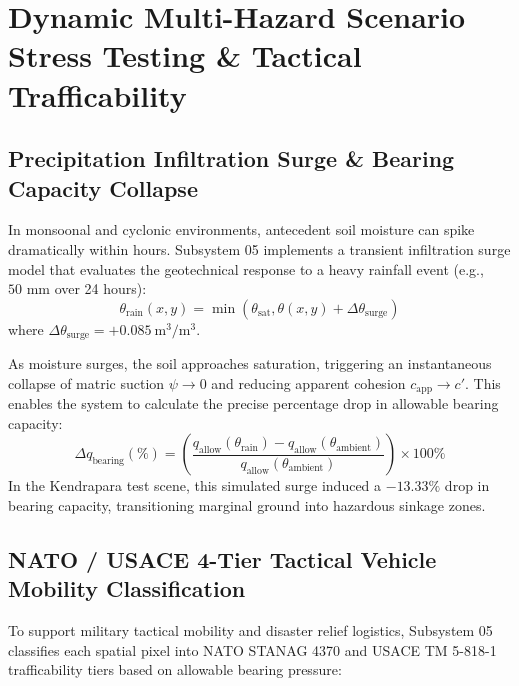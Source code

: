 \documentclass[11pt,a4paper]{article}
\theoremstyle{definition}
\theoremstyle{remark}
\begin{document}
\section{Dynamic Multi-Hazard Scenario Stress Testing \& Tactical Trafficability}

\subsection{Precipitation Infiltration Surge \& Bearing Capacity Collapse}
In monsoonal and cyclonic environments, antecedent soil moisture can spike dramatically within hours. Subsystem 05 implements a transient infiltration surge model that evaluates the geotechnical response to a heavy rainfall event (e.g., $50\text{ mm}$ over 24 hours):
\begin{equation}
    \theta_{\text{rain}}(x, y) = \min\left( \theta_{\text{sat}}, \theta(x, y) + \Delta \theta_{\text{surge}} \right)
\end{equation}
where $\Delta \theta_{\text{surge}} = +0.085~\text{m}^3/\text{m}^3$. 

As moisture surges, the soil approaches saturation, triggering an instantaneous collapse of matric suction $\psi \to 0$ and reducing apparent cohesion $c_{\text{app}} \to c'$. This enables the system to calculate the precise percentage drop in allowable bearing capacity:
\begin{equation}
    \Delta q_{\text{bearing}}(\%) = \left( \frac{q_{\text{allow}}(\theta_{\text{rain}}) - q_{\text{allow}}(\theta_{\text{ambient}})}{q_{\text{allow}}(\theta_{\text{ambient}})} \right) \times 100\%
\end{equation}
In the Kendrapara test scene, this simulated surge induced a $-13.33\%$ drop in bearing capacity, transitioning marginal ground into hazardous sinkage zones.

\subsection{NATO / USACE 4-Tier Tactical Vehicle Mobility Classification}
To support military tactical mobility and disaster relief logistics, Subsystem 05 classifies each spatial pixel into NATO STANAG 4370 and USACE TM 5-818-1 trafficability tiers based on allowable bearing pressure:
\end{document}
